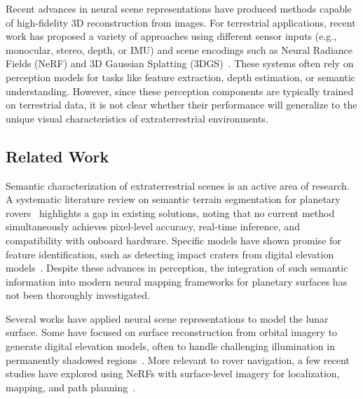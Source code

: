 Recent advances in neural scene representations have produced methods capable of high-fidelity 3D reconstruction from images. For terrestrial applications, recent work has proposed a variety of approaches using different sensor inputs (e.g., monocular, stereo, depth, or IMU) and scene encodings such as Neural Radiance Fields (NeRF) and 3D Gaussian Splatting (3DGS)~\cite{tosi_how_2024}. These systems often rely on perception models for tasks like feature extraction, depth estimation, or semantic understanding. However, since these perception components are typically trained on terrestrial data, it is not clear whether their performance will generalize to the unique visual characteristics of extraterrestrial environments.

\subsection{Related Work}

Semantic characterization of extraterrestrial scenes is an active area of research. A systematic literature review on semantic terrain segmentation for planetary rovers~\cite{kuang_semantic_2022} highlights a gap in existing solutions, noting that no current method simultaneously achieves pixel-level accuracy, real-time inference, and compatibility with onboard hardware. Specific models have shown promise for feature identification, such as detecting impact craters from digital elevation models~\cite{jia_moon_2021}. Despite these advances in perception, the integration of such semantic information into modern neural mapping frameworks for planetary surfaces has not been thoroughly investigated.

Several works have applied neural scene representations to model the lunar surface. Some have focused on surface reconstruction from orbital imagery to generate digital elevation models, often to handle challenging illumination in permanently shadowed regions~\cite{van_kints_neural_2025, adams_summary_2023}. More relevant to rover navigation, a few recent studies have explored using NeRFs with surface-level imagery for localization, mapping, and path planning~\cite{huang_monocular_2025, hansen_analyzing_2024, dai_neural_2023, zhang_neural_2024}.

